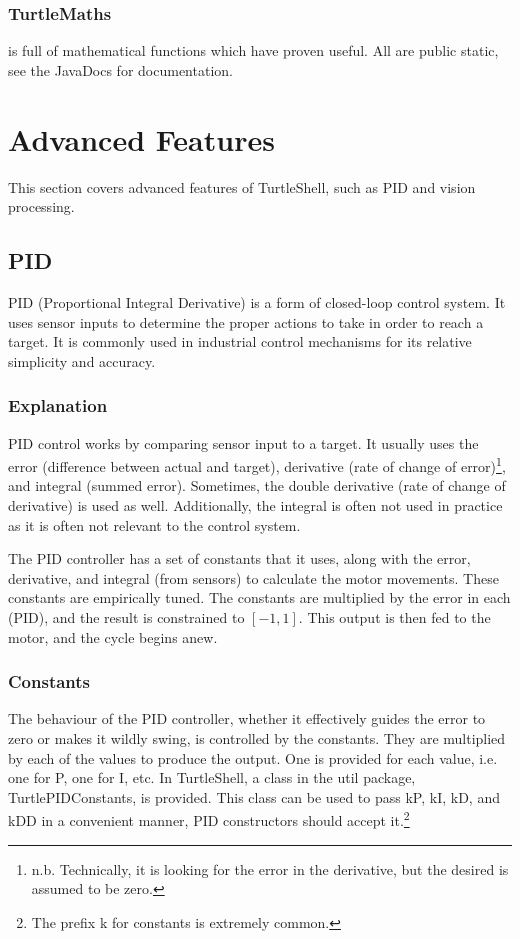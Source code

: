 \documentclass[]{report}
\begin{document}
\subsubsection{TurtleMaths}
 is full of mathematical functions which have proven useful. All are public static, see the JavaDocs for documentation.

\section{Advanced Features}
This section covers advanced features of TurtleShell, such as PID and vision processing.

\subsection{PID}
PID (Proportional Integral Derivative) is a form of closed-loop control system.
It uses sensor inputs to determine the proper actions to take in order to reach a target.
It is commonly used in industrial control mechanisms for its relative simplicity and accuracy.

\subsubsection{Explanation}
PID control works by comparing sensor input to a target.
It usually uses the error (difference between actual and target), derivative (rate of change of error)\footnote{n.b. Technically,
it is looking for the error in the derivative, but the desired is assumed to be zero.}, and integral (summed error).
Sometimes, the double derivative (rate of change of derivative) is used as well.
Additionally, the integral is often not used in practice as it is often not relevant to the control system.

The PID controller has a set of constants that it uses, along with the error, derivative, and integral (from sensors) to calculate the motor movements.
These constants are empirically tuned.
The constants are multiplied by the error in each (PID), and the result is constrained to $[-1,1]$.
This output is then fed to the motor, and the cycle begins anew.

\subsubsection{Constants}
The behaviour of the PID controller, whether it effectively guides the error to zero or makes it wildly swing, is controlled by the constants.
They are multiplied by each of the values to produce the output.
One is provided for each value, i.e. one for P, one for I, etc.
In TurtleShell, a class in the util package, TurtlePIDConstants, is provided.
This class can be used to pass kP, kI, kD, and kDD in a convenient manner, PID constructors should accept it.\footnote{The prefix k for constants is extremely common.}
\end{document}
